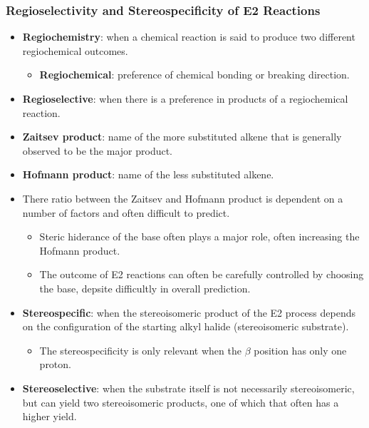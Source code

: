 \documentclass[12pt,a4paper]{article}
\begin{document}
\begin{itemize}
    \subsubsection{Regioselectivity and Stereospecificity of E2 Reactions}
    \begin{itemize}
        \item \textbf{Regiochemistry}: when a chemical reaction is said to produce two different regiochemical outcomes.
            \begin{itemize}
                \item \textbf{Regiochemical}: preference of chemical bonding or breaking {\color{o-Sun}direction}. 
            \end{itemize}
        \item \textbf{Regioselective}: when there is a preference in products of a regiochemical reaction.
        \item \textbf{Zaitsev product}: name of the more substituted alkene that is generally observed to be the major product.
        \item \textbf{Hofmann product}: name of the less substituted alkene.
        \item There ratio between the Zaitsev and Hofmann product is dependent on a number of factors and often difficult to predict.
            \begin{itemize}
                \item Steric hiderance of the base often plays a major role, often increasing the Hofmann product.
                \item The outcome of E2 reactions can often be carefully {\color{o-Sun} controlled by choosing the base}, depsite difficultly in overall prediction.
            \end{itemize}
        \item \textbf{Stereospecific}: when the stereoisomeric product of the E2 process depends on the configuration of the starting alkyl halide (stereoisomeric substrate).
            \begin{itemize}
                \item The stereospecificity is only relevant when the {\color{o-Sun}$\beta$ position has only one proton}.
            \end{itemize}
        \item \textbf{Stereoselective}: when the substrate itself is not necessarily stereoisomeric, but can yield two stereoisomeric products, one of which that often has a higher yield.
            \begin{itemize}

\end{itemize}
\end{itemize}
\end{itemize}
\end{document}
